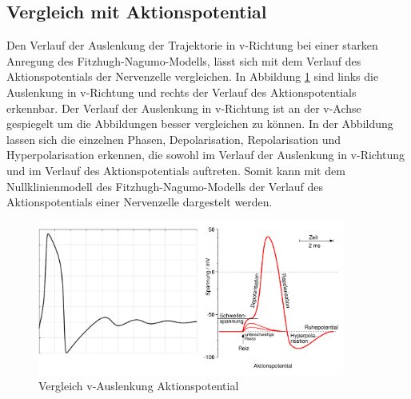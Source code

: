 \begin{refsection}
\subsection{Vergleich mit Aktionspotential}
Den Verlauf der Auslenkung der Trajektorie in v-Richtung bei einer starken Anregung des Fitzhugh-Nagumo-Modells, lässt
sich mit dem Verlauf des Aktionspotentials der Nervenzelle vergleichen. 
In Abbildung \ref{fig:Vergleich} sind links die Auslenkung in v-Richtung und rechts der Verlauf des Aktionspotentials
erkennbar.
Der Verlauf der Auslenkung in v-Richtung ist an der v-Achse gespiegelt um die Abbildungen besser vergleichen zu können.
In der Abbildung lassen sich die einzelnen Phasen, Depolarisation, Repolarisation und Hyperpolarisation erkennen, die
sowohl im Verlauf der Auslenkung in v-Richtung und im Verlauf des Aktionspotentials auftreten.
Somit kann mit dem Nullklinienmodell des Fitzhugh-Nagumo-Modells der Verlauf des Aktionspotentials einer Nervenzelle
dargestelt werden.
\begin{figure}[H]
    \centering
    \includegraphics[width=0.9\textwidth]{papers/nerven/Bilder/Vergleich.png}
    \caption{Vergleich v-Auslenkung Aktionspotential}
    \label{fig:Vergleich}
\end{figure}
%
%
%
%
%

\printbibliography[heading=subbibliography]
\end{refsection}
